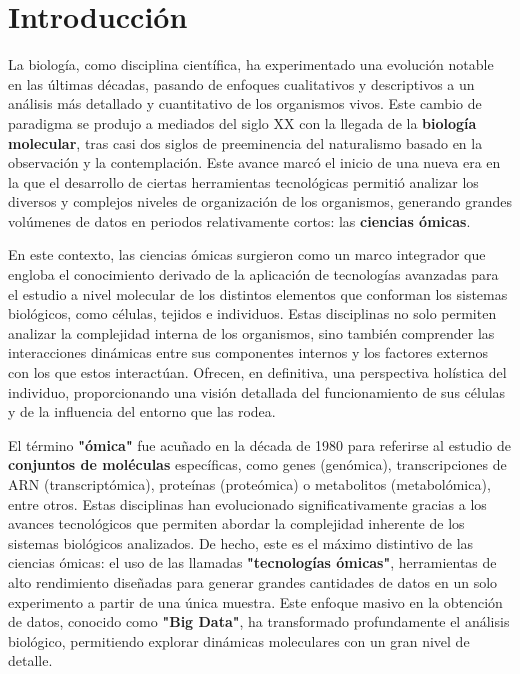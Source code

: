 \chapter{Introducción}

La biología, como disciplina científica, ha experimentado una evolución notable en las últimas décadas, 
pasando de enfoques cualitativos y descriptivos a un análisis más detallado y cuantitativo de los organismos 
vivos. Este cambio de paradigma se produjo a mediados del siglo XX con la llegada de la \textbf{biología molecular},
tras casi dos siglos de preeminencia del naturalismo basado en la observación y la contemplación. 
Este avance marcó el inicio de una nueva era en la que el desarrollo de ciertas herramientas tecnológicas permitió 
analizar los diversos y complejos niveles de organización de los organismos, generando grandes volúmenes de datos 
en periodos relativamente cortos: las \textbf{ciencias ómicas}. \newline%

En este contexto, las ciencias ómicas surgieron como un marco integrador que engloba el conocimiento derivado 
de la aplicación de tecnologías avanzadas para el estudio a nivel molecular de los distintos elementos que 
conforman los sistemas biológicos, como células, tejidos e individuos. Estas disciplinas no solo permiten 
analizar la complejidad interna de los organismos, sino también comprender las interacciones dinámicas 
entre sus componentes internos y los factores externos con los que estos interactúan. Ofrecen, en definitiva,
una perspectiva holística del individuo, proporcionando una visión detallada del funcionamiento de sus células 
y de la influencia del entorno que las rodea. \newline%

El término \textbf{"ómica"} fue acuñado en la década de 1980 para referirse al estudio de 
\textbf{conjuntos de moléculas} específicas, como genes (genómica), transcripciones de ARN (transcriptómica), 
proteínas (proteómica) o metabolitos (metabolómica), entre otros. Estas disciplinas han evolucionado 
significativamente gracias a los avances tecnológicos que permiten abordar la complejidad inherente de los 
sistemas biológicos analizados. De hecho, este es el máximo distintivo de las ciencias ómicas: el uso de las 
llamadas \textbf{"tecnologías ómicas"}, herramientas de alto rendimiento diseñadas para generar grandes cantidades 
de datos en un solo experimento a partir de una única muestra. Este enfoque masivo en la obtención de datos, 
conocido como \textbf{"Big Data"}, ha transformado profundamente el análisis biológico, permitiendo explorar 
dinámicas moleculares con un gran nivel de detalle.\newline%


